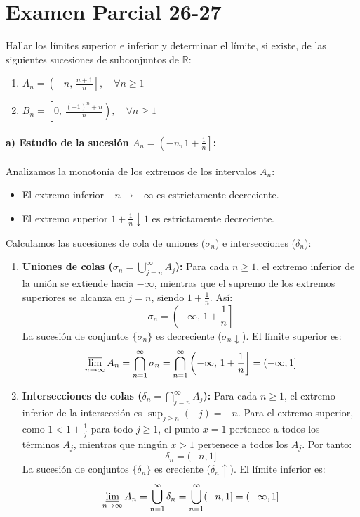 \section{Examen Parcial 26-27}
\setcounter{problemacontador}{0}
\begin{problema}
Hallar los límites superior e inferior y determinar el límite, si existe, de las siguientes sucesiones de subconjuntos de $\mathbb{R}$:
\begin{enumerate}[label=\alph*)]
    \item $A_n = \left(-n, \, \frac{n+1}{n}\right], \quad \forall n \ge 1$
    \item $B_n = \left[0, \, \frac{(-1)^n + n}{n}\right), \quad \forall n \ge 1$
\end{enumerate}

\tcblower

\paragraph{a) Estudio de la sucesión $A_n = \left(-n, 1 + \frac{1}{n}\right]$:}

Analizamos la monotonía de los extremos de los intervalos $A_n$:
\begin{itemize}
    \item El extremo inferior $-n \to -\infty$ es estrictamente decreciente.
    \item El extremo superior $1 + \frac{1}{n} \downarrow 1$ es estrictamente decreciente.
\end{itemize}

Calculamos las sucesiones de cola de uniones ($\sigma_n$) e intersecciones ($\delta_n$):
\begin{enumerate}[label=\arabic*.]
    \item \textbf{Uniones de colas ($\sigma_n = \bigcup_{j=n}^\infty A_j$):}
    Para cada $n \ge 1$, el extremo inferior de la unión se extiende hacia $-\infty$, mientras que el supremo de los extremos superiores se alcanza en $j = n$, siendo $1 + \frac{1}{n}$. Así:
    \[
        \sigma_n = \left(-\infty, \, 1 + \frac{1}{n}\right]
    \]
    La sucesión de conjuntos $\{\sigma_n\}$ es decreciente ($\sigma_n \downarrow$). El límite superior es:
    \[
        \varlimsup_{n \to \infty} A_n = \bigcap_{n=1}^\infty \sigma_n = \bigcap_{n=1}^\infty \left(-\infty, \, 1 + \frac{1}{n}\right] = (-\infty, 1]
    \]

    \item \textbf{Intersecciones de colas ($\delta_n = \bigcap_{j=n}^\infty A_j$):}
    Para cada $n \ge 1$, el extremo inferior de la intersección es $\sup_{j \ge n} (-j) = -n$. Para el extremo superior, como $1 < 1 + \frac{1}{j}$ para todo $j \ge 1$, el punto $x = 1$ pertenece a todos los términos $A_j$, mientras que ningún $x > 1$ pertenece a todos los $A_j$. Por tanto:
    \[
        \delta_n = (-n, 1]
    \]
    La sucesión de conjuntos $\{\delta_n\}$ es creciente ($\delta_n \uparrow$). El límite inferior es:
    \[
        \varliminf_{n \to \infty} A_n = \bigcup_{n=1}^\infty \delta_n = \bigcup_{n=1}^\infty (-n, 1] = (-\infty, 1]
    \]
\end{enumerate}


\end{problema}
